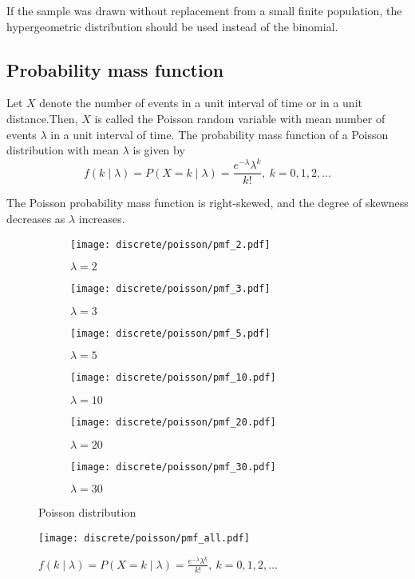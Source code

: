 If the sample was drawn without replacement from a small finite population, the hypergeometric distribution should be used instead of the binomial.

\subsection{Probability mass function}
Let $X$ denote the number of events in a unit interval of time or in a unit distance.Then, $X$ is called the Poisson random variable with mean number of events $\lambda$ in a unit interval of time. The probability mass function of a Poisson distribution with mean $\lambda$ is given by
\[
 	f(k \mid \lambda) = P(X = k \mid \lambda) = \frac{e^{-\lambda} \lambda^k}{k!}, \ k = 0, 1, 2, \ldots
\]

The Poisson probability mass function is right-skewed, and the degree of skewness decreases as $\lambda$ increases.

\begin{figure}[H]
	\centering
	\begin{subfigure}[b]{0.45\textwidth}
		\texttt{[image: discrete/poisson/pmf\_2.pdf]}
		\caption{$\lambda = 2$}
	\end{subfigure}
	\begin{subfigure}[b]{0.45\textwidth}
		\texttt{[image: discrete/poisson/pmf\_3.pdf]}
		\caption{$\lambda = 3$}
	\end{subfigure}
	\begin{subfigure}[b]{0.45\textwidth}
		\texttt{[image: discrete/poisson/pmf\_5.pdf]}
		\caption{$\lambda = 5$}
	\end{subfigure}
	\begin{subfigure}[b]{0.45\textwidth}
		\texttt{[image: discrete/poisson/pmf\_10.pdf]}
		\caption{$\lambda = 10$}
	\end{subfigure}
	\begin{subfigure}[b]{0.45\textwidth}
		\texttt{[image: discrete/poisson/pmf\_20.pdf]}
		\caption{$\lambda = 20$}
	\end{subfigure}
	\begin{subfigure}[b]{0.45\textwidth}
		\texttt{[image: discrete/poisson/pmf\_30.pdf]}
		\caption{$\lambda = 30$}
	\end{subfigure}
	\caption{Poisson distribution}
\end{figure}

\begin{figure}[H]
	\texttt{[image: discrete/poisson/pmf\_all.pdf]}
	\caption{$f(k \mid \lambda) = P(X = k \mid \lambda) = \frac{e^{-\lambda} \lambda^k}{k!}, \ k = 0, 1, 2, \ldots$}
\end{figure}

